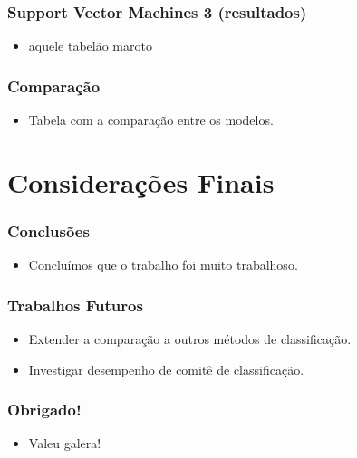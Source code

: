 \documentclass{beamer}
\begin{document}
\begin{frame}

	\frametitle{Support Vector Machines 3 (resultados)}
	
	\begin{itemize}	
		\item aquele tabelão maroto
	\end{itemize}
	
\end{frame}

\begin{frame}

	\frametitle{Comparação}
	
	\begin{itemize}	
		\item Tabela com a comparação entre os modelos.
	\end{itemize}
	
\end{frame}

\section{Considerações Finais}

\begin{frame}

	\frametitle{Conclusões}
	
	\begin{itemize}
		\setlength\itemsep{1em}
		
		\item Concluímos que o trabalho foi muito trabalhoso.
	
	\end{itemize}


\end{frame}

\begin{frame}

	\frametitle{Trabalhos Futuros}
	
	\begin{itemize}
		\setlength\itemsep{1em}
		
		\item Extender a comparação a outros métodos de classificação.
		\item Investigar desempenho de comitê de classificação.
	
	\end{itemize}


\end{frame}


\begin{frame}
	\frametitle{Obrigado!}
    
    \centering
    
    \begin{itemize}
    	\setlength\itemsep{2em}
		\item Valeu galera!
	\end{itemize}

\end{frame}
\end{document}
